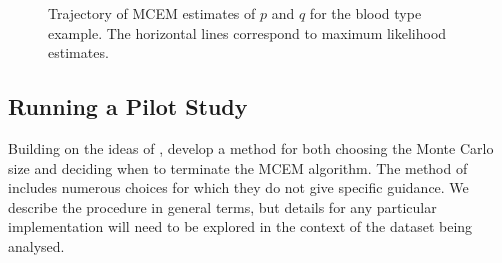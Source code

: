 \documentclass[11pt, oneside]{article}   	%
\begin{document}
   



\begin{figure}
    \centering
    \caption{Trajectory of MCEM estimates of $p$ and $q$ for the blood type example. The horizontal lines correspond to maximum likelihood estimates.}
    \label{fig:blood_naive_MCEM_traj}
    
\end{figure}


\subsection{Running a Pilot Study \citep{Cha95}}

Building on the ideas of \citeauthor{Wei90}, \citet{Cha95} develop a method for both choosing the Monte Carlo size and deciding when to terminate the MCEM algorithm. The method of \citeauthor{Cha95} includes numerous choices for which they do not give specific guidance. We describe the procedure in general terms, but details for any particular implementation will need to be explored in the context of the dataset being analysed. 
\end{document}
